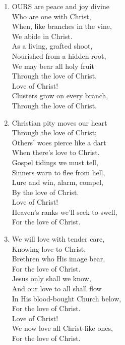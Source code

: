 \documentclass[11pt,a4paper]{article}
\begin{document}
\begin{enumerate}
    \item OURS are peace and joy divine \\
        Who are one with Christ, \\
        When, like branches in the vine, \\
        We abide in Christ. \\
        As a living, grafted shoot, \\
        Nourished from a hidden root, \\
        We may bear all holy fruit \\
        Through the love of Christ. \\
        Love of Christ! \\
        Clusters grow on every branch, \\
        Through the love of Christ.

    \item Christian pity moves our heart \\
        Through the love of Christ; \\
        Others' woes pierce like a dart \\
        When there's love to Christ. \\
        Gospel tidings we must tell, \\
        Sinners warn to flee from hell, \\
        Lure and win, alarm, compel, \\
        By the love of Christ. \\
        Love of Christ! \\
        Heaven's ranks we'll seek to swell, \\
        For the love of Christ.

    \item We will love with tender care, \\
        Knowing love to Christ, \\
        Brethren who His image bear, \\
        For the love of Christ. \\
        Jesus only shall we know, \\
        And our love to all shall flow \\
        In His blood-bought Church below, \\
        For the love of Christ. \\
        Love of Christ! \\
        We now love all Christ-like ones, \\
        For the love of Christ.


\end{enumerate}
\end{document}
